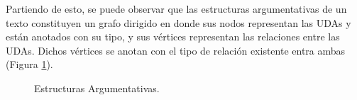 \documentclass[a4paper,11pt,twocolumn,twoside]{article}
\begin{document}
Partiendo de esto, se puede observar que las estructuras argumentativas de un texto constituyen un grafo dirigido 
en donde sus nodos representan las UDAs y están anotados con su tipo, y sus vértices representan las 
relaciones entre las UDAs. Dichos vértices se anotan con el tipo de relación existente entra ambas 
(Figura \ref{fig:arg_struct}).

\begin{figure}[h]
	\centering
	
	\caption{Estructuras Argumentativas.}
	\label{fig:arg_struct}
\end{figure}




\end{document}
